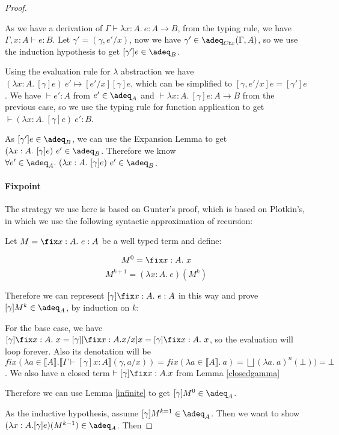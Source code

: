 \begin{proof}
\begin{enumerate}
{As we have a derivation of $\Gamma \vdash \lambda x:A. \ e : A \to B$, from the typing rule, we have $\Gamma, x:A \vdash e: B$. Let $\gamma' = (\gamma, e'/x)$, now we have $\gamma' \in \adeq_{Ctx}(\Gamma, A)$, so we use the induction hypothesis to get $[\gamma']e \in \adeq_B$.


Using the evaluation rule for $\lambda$ abstraction we have $(\lambda x:A. \ [\gamma]e) \ e' \mapsto [e'/x][\gamma]e$, which can be simplified to $[\gamma, e'/x]e = [\gamma']e$. We have $\vdash e' : A$ from $e' \in \adeq_A$ and $\vdash \lambda x:A. \ [\gamma] e : A \to B$ from the previous case, so we use the typing rule for function application to get $\vdash (\lambda x:A. \ [\gamma]e) \ e' : B$.

As $[\gamma']e \in \adeq_B$, we can use the Expansion Lemma to get $(\lambda x:A. \ [\gamma]e) \ e' \in \adeq_B$. Therefore we know $\forall e' \in \adeq_A. \ (\lambda x:A. \ [\gamma]e) \ e' \in \adeq_B$.}
\end{enumerate}

\paragraph{Fixpoint} The strategy we use here is based on Gunter's proof, which is based on Plotkin's, in which we use the following syntactic approximation of recursion:

\begin{defn} \label{un}
Let $M = \fix x : A. \ e : A$ be a well typed term and define:

\[M^0 = \fix x : A. \ x \]
\[ M^{k+1} = (\lambda x : A. \ e)(M^k)\]
\end{defn}

Therefore we can represent $[\gamma]\fix x:A. \ e :A$ in this way and prove $[\gamma]M^k \in \adeq_A$, by induction on $k$:

For the base case, we have $[\gamma] \fix x:A. \ x = [\gamma][\fix x:A. x/x]x = [\gamma] \fix x:A. \ x$, so the evaluation will loop forever. Also its denotation will be $fix (\lambda a \in \llbracket A \rrbracket . \llbracket \Gamma \vdash [\gamma]x:A \rrbracket (\gamma, a/x)) = fix( \lambda a \in \llbracket A \rrbracket. \ a) = \bigsqcup( \lambda a. \ a)^n(\bot)) = \bot$. We also have a closed term $\vdash [\gamma]\fix x:A. x$ from Lemma \ref{closedgamma}

 Therefore we can use Lemma \ref{infinite} to get $[\gamma]M^0 \in \adeq_A$.

As the inductive hypothesis, assume $[\gamma]M^{k=1} \in \adeq_A$. Then we want to show $(\lambda x:A. [\gamma]e)(M^{k-1}) \in \adeq_A$. Then


\end{proof}
